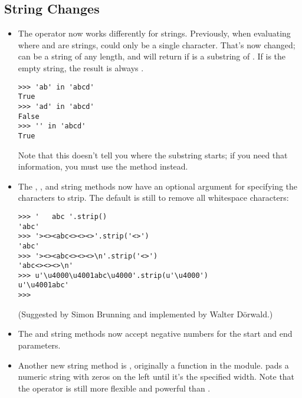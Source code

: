 \documentclass{howto}
\begin{document}
\subsection{String Changes}

\begin{itemize}

\item The  operator now works differently for strings.
Previously, when evaluating  where 
and  are strings,  could only be a single character.
That's now changed;  can be a string of any length, and
 will return  if  is a
substring of .  If  is the empty string, the result is
always .

\begin{verbatim}
>>> 'ab' in 'abcd'
True
>>> 'ad' in 'abcd'
False
>>> '' in 'abcd'
True
\end{verbatim}

Note that this doesn't tell you where the substring starts; if you
need that information, you must use the  method
instead.

\item The , , and 
string methods now have an optional argument for specifying the
characters to strip.  The default is still to remove all whitespace
characters:

\begin{verbatim}
>>> '   abc '.strip()
'abc'
>>> '><><abc<><><>'.strip('<>')
'abc'
>>> '><><abc<><><>\n'.strip('<>')
'abc<><><>\n'
>>> u'\u4000\u4001abc\u4000'.strip(u'\u4000')
u'\u4001abc'
>>>
\end{verbatim}

(Suggested by Simon Brunning and implemented by Walter D\"orwald.)

\item The  and 
string methods now accept negative numbers for the start and end
parameters.

\item Another new string method is , originally a
function in the  module.   pads a
numeric string with zeros on the left until it's the specified width.
Note that the \code{\%} operator is still more flexible and powerful
than .


\end{itemize}
\end{document}

